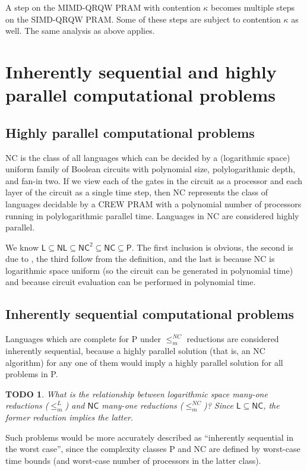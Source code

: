 \documentclass{article}
\newtheorem{todo}{TODO}
\begin{document}
A step on the MIMD-QRQW PRAM with contention $\kappa$ becomes multiple steps on the SIMD-QRQW PRAM.
Some of these steps are subject to contention $\kappa$ as well.
The same analysis as above applies.

\section{Inherently sequential and highly parallel computational problems}

\subsection{Highly parallel computational problems}\label{sec:definenc}

\textsf{NC} is the class of all languages which can be decided by a (logarithmic space) uniform family of Boolean circuits with polynomial size, polylogarithmic depth, and fan-in two.
If we view each of the gates in the circuit as a processor and each layer of the circuit as a single time step, then \textsf{NC} represents the class of languages decidable by a CREW PRAM with a polynomial number of processors running in polylogarithmic parallel time.
Languages in \textsf{NC} are considered highly parallel.

We know $\mathsf{L}\subseteq\mathsf{NL}\subseteq\mathsf{NC}^2\subseteq\mathsf{NC}\subseteq\mathsf{P}$.
The first inclusion is obvious, the second is due to \cite{borodin77}, the third follow from the definition, and the last is because \textsf{NC} is logarithmic space uniform (so the circuit can be generated in polynomial time) and because circuit evaluation can be performed in polynomial time.

\subsection{Inherently sequential computational problems}

Languages which are complete for \textsf{P} under $\leq_m^{NC}$ reductions are considered inherently sequential, because a highly parallel solution (that is, an \textsf{NC} algorithm) for any one of them would imply a highly parallel solution for all problems in \textsf{P}.
\begin{todo}
  What is the relationship between logarithmic space many-one reductions ($\leq_m^L$) and $\mathsf{NC}$ many-one reductions ($\leq_m^{NC}$)?
  Since $\mathsf{L}\subseteq\mathsf{NC}$, the former reduction implies the latter.
\end{todo}
Such problems would be more accurately described as ``inherently sequential in the worst case'', since the complexity classes \textsf{P} and \textsf{NC} are defined by worst-case time bounds (and worst-case number of processors in the latter class).
\end{document}
